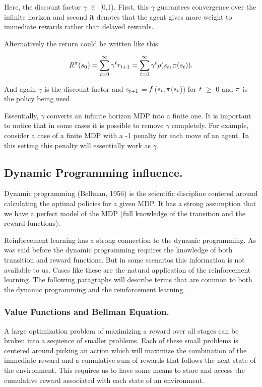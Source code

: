 Here, the discount factor $\gamma$ $\in$ [0,1). First, this $\gamma$ guarantees convergence over the infinite horizon and second it denotes that the agent gives more weight to immediate rewards rather than delayed rewards.

Alternatively the return could be written like this:

$$ \emph{$R^{\pi}$}(s_{0}) = \sum_{t=0}^{\infty}\emph{$\gamma^{t}r_{t+1}$} = \sum_{t=0}^{\infty}\emph{$\gamma^{t}\rho$}(\emph{$s_{t}$},\emph{$\pi$}(\emph{$s_{t}$})). $$

And again $\gamma$ is the discount factor and $\emph{$s_{t+1}$}$ = $\emph{f}$ ($\emph{$s_{t}$}$,$\emph{$\pi$}$($\emph{$s_{t}$}$)) for $\emph{t}$ $\geq$ 0 and $\emph{$\pi$}$ is the policy being used.

Essentially, $ \gamma $ converts an infinite horizon MDP into a finite one. It is important to notice that in some cases it is possible to remove $ \gamma $ completely. For example, consider a case of a finite MDP with a -1 penalty for each move of an agent. In this setting this penalty will essentially work as $\gamma$.

\subsection{Dynamic Programming influence.}
\label{sec:dynamic-programming-influence}

Dynamic programming (Bellman, 1956\nocite{bellman1956dynamic}) is the scientific discipline centered around calculating the optimal policies for a given MDP. It has a strong assumption that we have a perfect model of the MDP (full knowledge of the transition and the reward functions).

Reinforcement learning has a strong connection to the dynamic programming. As was said before the dynamic programming requires the knowledge of both transition and reward functions. But in some scenarios this information is not available to us. Cases like these are the natural application of the reinforcement learning. The following paragraphs will describe terms that are common to both the dynamic programming and the reinforcement learning.

\subsubsection{Value Functions and Bellman Equation.}

A large optimization problem of maximizing a reward over all stages can be broken into a sequence of smaller problems. Each of these small problems is centered around picking an action which will maximize the combination of the immediate reward and a cumulative sum of rewards that follows the next state of the environment. This requires us to have some means to store and access the cumulative reward associated with each state of an environment.

